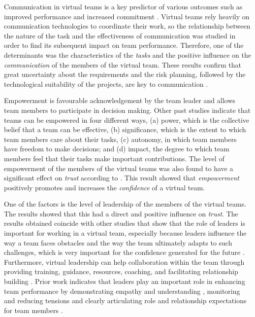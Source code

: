 Communication in virtual teams is a key predictor of various outcomes such as improved performance and increased commitment \cite{Ferrell2018}.  Virtual teams rely heavily on communication technologies to coordinate their work, so the relationship between the nature of the task and the effectiveness of communication was studied in order to find its subsequent impact on team performance.  Therefore, one of the determinants was the characteristics of the \textit{tasks} and the positive influence on the \textit{communication} of the members of the virtual team. These results confirm that great uncertainty about the requirements and the risk planning, followed by the technological suitability of the projects, are key to communication \cite{Garro2021}.  

Empowerment is favourable acknowledgement by the team leader and allows team members to participate in decision making.  Other past studies \cite{Kirkman2014} indicate that teams can be empowered in four different ways, (a) power, which is the collective belief that a team can be effective, (b) significance, which is the extent to which team members care about their tasks, (c) autonomy, in which team members have freedom to make decisions; and (d) impact, the degree to which team members feel that their tasks make important contributions. The level of empowerment of the members of the virtual teams was also found to have a significant effect on \textit{trust} according to \cite{Garro2021}. This result showed that \textit{empowerment} positively promotes and increases the \textit{confidence} of a virtual team.

One of the factors is the level of leadership of the members of the virtual teams.   The results showed that this had a direct and positive influence on \textit{trust}. The results obtained coincide with other studies that show that the role of leaders is important for working in a virtual team, especially because leaders influence the way a team faces obstacles and the way the team ultimately adapts to such challenges, which is very important for the confidence generated for the future \cite{Baard2014}.  Furthermore, virtual leadership can help collaboration within the team through providing training, guidance, resources, coaching, and facilitating relationship building \cite{Liao2017}.  Prior work indicates that leaders play an important role in enhancing team performance by demonstrating empathy and understanding \cite{Kayworth2002}, monitoring and reducing tensions \cite{Wakefield2008} and clearly articulating role and relationship expectations for team members \cite{Kayworth2002}.

